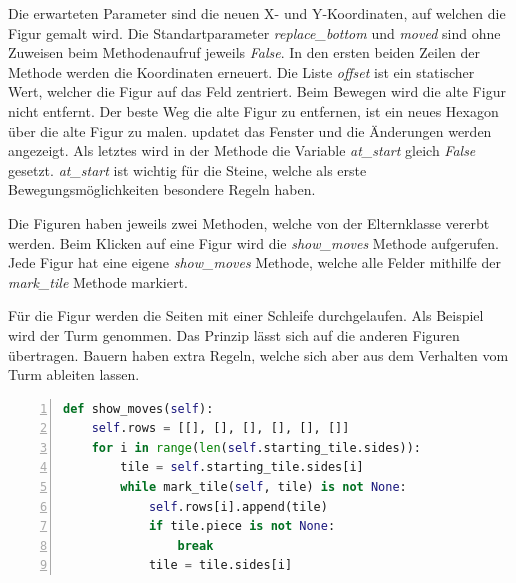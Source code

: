 Die erwarteten Parameter sind die neuen X- und Y-Koordinaten, auf welchen die Figur gemalt wird. Die Standartparameter \textit{replace\_bottom} und \textit{moved} sind ohne Zuweisen beim Methodenaufruf jeweils \textit{False}. In den ersten beiden Zeilen der Methode werden die Koordinaten erneuert. Die Liste \textit{offset} ist ein statischer Wert, welcher die Figur auf das Feld zentriert. Beim Bewegen wird die alte Figur nicht entfernt. Der beste Weg die alte Figur zu entfernen, ist ein neues Hexagon über die alte Figur zu malen.  updatet das Fenster und die Änderungen werden angezeigt. Als letztes wird in der Methode die Variable \textit{at\_start} gleich \textit{False} gesetzt. \textit{at\_start} ist wichtig für die Steine, welche als erste Bewegungsmöglichkeiten besondere Regeln haben.\par
Die Figuren haben jeweils zwei Methoden, welche von der Elternklasse vererbt werden. Beim Klicken auf eine Figur wird die \textit{show\_moves} Methode aufgerufen. Jede Figur hat eine eigene \textit{show\_moves} Methode, welche alle Felder mithilfe der \textit{mark\_tile} Methode markiert.\par
Für die Figur werden die Seiten mit einer Schleife durchgelaufen. Als Beispiel wird der Turm genommen. Das Prinzip lässt sich auf die anderen Figuren übertragen. Bauern haben extra Regeln, welche sich aber aus dem Verhalten vom Turm ableiten lassen.

\begin{lstlisting}[language=python,caption={Figur zeige Bewegungsmöglichkeiten},captionpos=b,label={lst:hexa:show},numbers=left,frame=none,escapechar=|]
def show_moves(self):
    self.rows = [[], [], [], [], [], []]
    for i in range(len(self.starting_tile.sides)):
        tile = self.starting_tile.sides[i]
        while mark_tile(self, tile) is not None:
            self.rows[i].append(tile)
            if tile.piece is not None:
                break
            tile = tile.sides[i]

\end{lstlisting}

